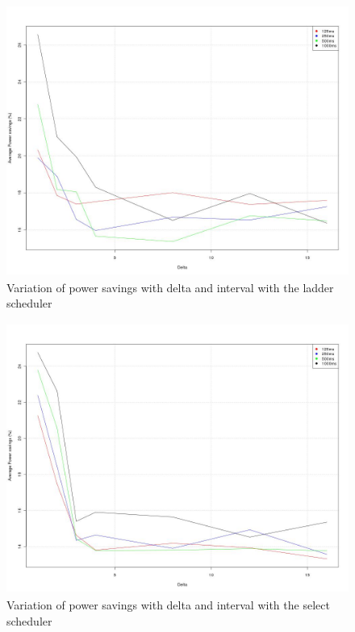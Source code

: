 \begin{figure}[h!]
  \begin{center}
    \includegraphics[height=3.5in]{figures/trends_avgpwr_ladder.jpg}%
    \caption{Variation of power savings with delta and interval with the ladder scheduler}
    \label{fig:pwr_trends_ladder}
  \end{center}
\end{figure}

\begin{figure}[h!]
  \begin{center}
    \includegraphics[height=3.5in]{figures/trends_avgpwr_select.jpg}%
    \caption{Variation of power savings with delta and interval with the select scheduler}
    \label{fig:pwr_trends_select}
  \end{center}
\end{figure}


